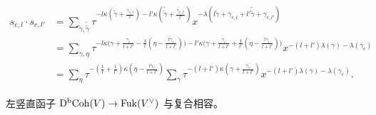 
\begin{corollary}\label{cor:product-basis}
\begin{align*}
s_{e,l}\cdot s_{e,l'}&=\sum_{\tilde\gamma,\tilde{\tilde\gamma}}
\tau^{-l\kappa(\tilde\gamma+\frac{\gamma_{e,l}}{l})
-l'\kappa(\tilde{\tilde\gamma}+\frac{\gamma_{e,l'}}{l'})}
x^{-\lambda(l\tilde\gamma+\gamma_{e,l}+l'\tilde{\tilde\gamma}+\gamma_{e,l'})}\\
&=\sum_{\gamma,\eta}\tau^{-l\kappa\bigl(\gamma+\frac{\gamma_e}{l+l'}
-\frac1l(\eta-\frac{l\gamma_e}{l+l'})\bigr)
-l'\kappa\bigl(\gamma+\frac{\gamma_e}{l+l'}+\frac1{l'}
(\eta-\frac{l\gamma_e}{l+l'})\bigr)}
x^{-(l+l')\lambda(\gamma)-\lambda(\gamma_e)}\\
&=\sum_\eta\tau^{-(\frac1l+\frac1{l'})\kappa(\eta-\frac{l\gamma_e}{l+l'})}
\sum_\gamma\tau^{-(l+l')\kappa(\gamma+\frac{\gamma_e}{l+l'})}
x^{-(l+l')\lambda(\gamma)-\lambda(\gamma_e)}.
\end{align*}
\end{corollary}

\begin{claim}\label{claim:functor-composition}
左竖直函子 $\mathrm{D}^{\mathrm{b}}\mathrm{Coh}(V)\to\mathrm{Fuk}(V^{\vee})$ 与复合相容。
\end{claim}

